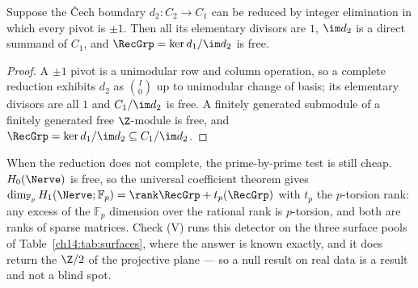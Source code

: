 \begin{proposition}\label{ch14:prop:cert}
Suppose the \v Cech boundary $d_2\colon C_2\to C_1$ can be reduced by integer elimination in
which every pivot is $\pm1$. Then all its elementary divisors are $1$, $\im d_2$ is a direct
summand of $C_1$, and $\RecGrp=\ker d_1/\im d_2$ is free.
\end{proposition}

\begin{proof}
A $\pm1$ pivot is a unimodular row and column operation, so a complete reduction exhibits
$d_2$ as $\binom{I}{0}$ up to unimodular change of basis; its elementary divisors are all
$1$ and $C_1/\im d_2$ is free. A finitely generated submodule of a finitely generated free
$\Z$-module is free, and $\RecGrp=\ker d_1/\im d_2\subseteq C_1/\im d_2$.
\end{proof}

\begin{remark}\label{ch14:rem:detector}
When the reduction does not complete, the prime-by-prime test is still cheap. $H_0(\Nerve)$
is free, so the universal coefficient theorem gives
$\dim_{\mathbb F_p}H_1(\Nerve;\mathbb F_p)=\rank\RecGrp+t_p(\RecGrp)$ with $t_p$ the $p$-torsion
rank: any excess of the $\mathbb F_p$ dimension over the rational rank is $p$-torsion, and
both are ranks of sparse matrices. Check (V) runs this detector on the three surface pools of
Table~\ref{ch14:tab:surfaces}, where the answer is known exactly, and it does return the $\Z/2$ of
the projective plane --- so a null result on real data is a result and not a blind spot.
\end{remark}

